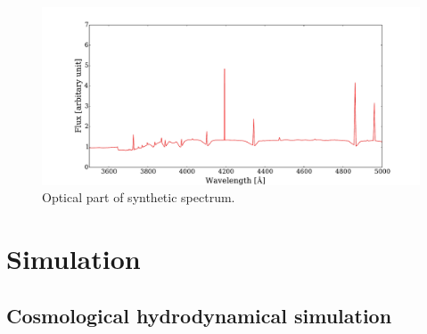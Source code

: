 \documentclass[useAMS,usenatbib,twocolumn]{mn2e}
\begin{document}
\begin{figure}
 \begin{center}
  \includegraphics[angle=0,width=\columnwidth]{figure/spectral_synthesis_3500-5000.pdf}
  \caption{Optical part of synthetic spectrum.}
 \end{center}
\end{figure}



\section{Simulation}
\subsection{Cosmological hydrodynamical simulation}
\end{document}
